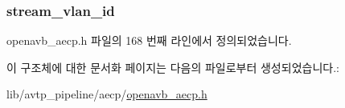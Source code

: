 \subsubsection[{\texorpdfstring{stream\+\_\+vlan\+\_\+id}{stream_vlan_id}}]{ stream\+\_\+vlan\+\_\+id}\hypertarget{structopenavb__aecp__response__data__get__stream__info__t_a31db70d552fc6f5d35875430fca593e6}{}\label{structopenavb__aecp__response__data__get__stream__info__t_a31db70d552fc6f5d35875430fca593e6}


openavb\+\_\+aecp.\+h 파일의 168 번째 라인에서 정의되었습니다.



이 구조체에 대한 문서화 페이지는 다음의 파일로부터 생성되었습니다.\+:\begin{DoxyCompactItemize}
\item 
lib/avtp\+\_\+pipeline/aecp/\hyperlink{openavb__aecp_8h}{openavb\+\_\+aecp.\+h}\end{DoxyCompactItemize}
